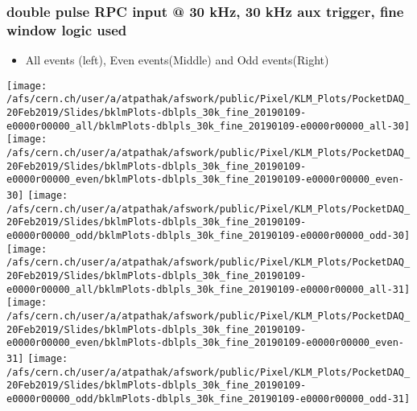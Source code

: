 \documentclass{beamer}
\begin{document}
\begin{frame}
\frametitle{\small double pulse RPC input @ 30 kHz, 30 kHz aux trigger, fine window logic used}
\vspace*{.05cm}
\begin{center}
 \begin{itemize}
\item { \small All events (left), Even events(Middle) and Odd events(Right)}
\end{itemize}
\begin{normalsize}

\vspace*{-.2cm}
\begin{center}

\texttt{[image: /afs/cern.ch/user/a/atpathak/afswork/public/Pixel/KLM\_Plots/PocketDAQ\_20Feb2019/Slides/bklmPlots-dblpls\_30k\_fine\_20190109-e0000r00000\_all/bklmPlots-dblpls\_30k\_fine\_20190109-e0000r00000\_all-30]}
\texttt{[image: /afs/cern.ch/user/a/atpathak/afswork/public/Pixel/KLM\_Plots/PocketDAQ\_20Feb2019/Slides/bklmPlots-dblpls\_30k\_fine\_20190109-e0000r00000\_even/bklmPlots-dblpls\_30k\_fine\_20190109-e0000r00000\_even-30]}
\texttt{[image: /afs/cern.ch/user/a/atpathak/afswork/public/Pixel/KLM\_Plots/PocketDAQ\_20Feb2019/Slides/bklmPlots-dblpls\_30k\_fine\_20190109-e0000r00000\_odd/bklmPlots-dblpls\_30k\_fine\_20190109-e0000r00000\_odd-30]} \\

\texttt{[image: /afs/cern.ch/user/a/atpathak/afswork/public/Pixel/KLM\_Plots/PocketDAQ\_20Feb2019/Slides/bklmPlots-dblpls\_30k\_fine\_20190109-e0000r00000\_all/bklmPlots-dblpls\_30k\_fine\_20190109-e0000r00000\_all-31]}
\texttt{[image: /afs/cern.ch/user/a/atpathak/afswork/public/Pixel/KLM\_Plots/PocketDAQ\_20Feb2019/Slides/bklmPlots-dblpls\_30k\_fine\_20190109-e0000r00000\_even/bklmPlots-dblpls\_30k\_fine\_20190109-e0000r00000\_even-31]}
\texttt{[image: /afs/cern.ch/user/a/atpathak/afswork/public/Pixel/KLM\_Plots/PocketDAQ\_20Feb2019/Slides/bklmPlots-dblpls\_30k\_fine\_20190109-e0000r00000\_odd/bklmPlots-dblpls\_30k\_fine\_20190109-e0000r00000\_odd-31]} \\

\end{center}
\end{normalsize}
\end{center}
\end{frame}
\end{document}
